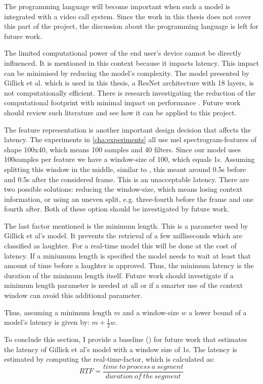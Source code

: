 \documentclass[bsc,frontabs,parskip,deptreport]{infthesis}
\begin{document}
The programming language will become important when such a model is integrated with a video call system. Since the work in this thesis does not cover this part of the project, the discussion about the programming language is left for future work.

The limited computational power of the end user's device cannot be directly influenced. It is mentioned in this context because it impacts latency. This impact can be minimised by reducing the model's complexity.
The model presented by Gillick et al. which is used in this thesis, a ResNet architecture with 18 layers, is not computationally efficient. There is research investigating the reduction of the computational footprint with minimal impact on performance \cite{sorensen2020depthwise}. Future work should review such literature and see how it can be applied to this project. 

The feature representation is another important design decision that affects the latency.
The experiments in \autoref{cha:experiments} all use mel spectrogram-features of shape 100x40, which means 100 samples and 40 filters. 
Since our model uses 100samples per feature we have a window-size of 100, which equals 1s.
Assuming splitting this window in the middle, similar to , this meant around 0.5s before and 0.5s after the considered frame. This is an unacceptable latency.
There are two possible solutions: reducing the window-size, which means losing context information, or using an uneven split, e.g. three-fourth before the frame and one fourth after. 
Both of these option should be investigated by future work.

The last factor mentioned is the minimum length. This is a parameter used by Gillick et al's model. It prevents the retrieval of a few milliseconds which are classified as laughter. For a real-time model this will be done at the cost of latency. If a miniumum length is specified the model needs to wait at least that amount of time before a laughter is approved. Thus, the minimum latency is the duration of the minimum length itself.
Future work should investigate if a minimum length parameter is needed at all or if a smarter use of the context window can avoid this additional parameter.

Thus, assuming a minimum length $m$ and a window-size $w$ a lower bound of a model's latency is given by: $m + \frac{1}{2}w$.

To conclude this section, I provide a baseline () for future work that estimates the latency of Gillick et al's model with a window size of 1s. 
The latency is estimated by computing the real-time-factor, which is calculated as: 
$$ RTF = \frac{time\ to\ process\ a\ segment}{duration\ of\ the\ segment} $$
\end{document}
